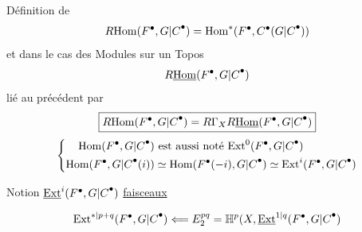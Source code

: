 Définition de
\[
R\mathrm{Hom}(F^\bullet,{G|C}^\bullet)
=\mathrm{Hom}^*(F^\bullet,C^\bullet({G|C}^\bullet))
\]
et dans le cas des Modules sur un Topos
\[
R\underline{\mathrm{Hom}}(F^\bullet,{G|C}^\bullet)
\]
lié au précédent par
\[
\boxed{R\mathrm{Hom}(F^\bullet,{G|C}^\bullet)=
R\Gamma_X R\underline{\mathrm{Hom}}(F^\bullet,{G|C}^\bullet)}
\]
\[
\left\{\begin{aligned}
\mathrm{Hom}(F^\bullet,{G|C}^\bullet)&\text{ est aussi noté }
\mathrm{Ext}^0(F^\bullet,{G|C}^\bullet)\\
\mathrm{Hom}(F^\bullet,{G|C}^\bullet(i))&\simeq
\mathrm{Hom}(F^\bullet(-i),{G|C}^\bullet)
\simeq\mathrm{Ext}^i(F^\bullet,{G|C}^\bullet)
\end{aligned}\right.
\]

Notion $\underline{\mathrm{Ext}}^i(F^\bullet,{G|C}^\bullet)$
\uline{faisceaux}

\[
\mathrm{Ext}^{{*|p+q}}(F^\bullet,{G|C}^\bullet)
\Longleftarrow E^{pq}_2=
\mathbb H^p(X,\underline{\mathrm{Ext}}^{{1|q}}(F^\bullet,{G|C}^\bullet)
\]
